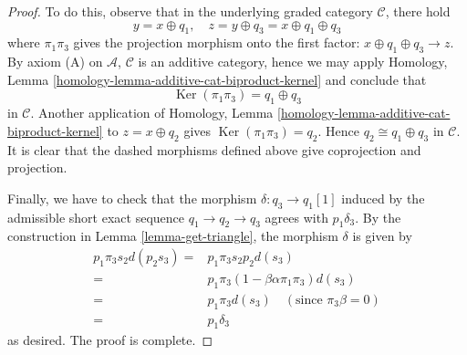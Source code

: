 \documentclass{stacks-project}
\theoremstyle{plain}
\theoremstyle{definition}
\theoremstyle{remark}
\numberwithin{equation}{subsection}
\def\Ker{\mathop{\mathrm{Ker}}}
\begin{document}
\begin{proof}
To do this, observe that in the underlying graded category
$\mathcal{C}$, there hold
$$
y = x\oplus q_1,\quad
z = y\oplus q_3 = x\oplus q_1\oplus q_3
$$
where $\pi_1\pi_3$ gives the projection morphism onto the first
factor: $x\oplus q_1\oplus q_3\to z$. By axiom (A) on
$\mathcal{A}$, $\mathcal{C}$ is an additive category, hence
we may apply
Homology, Lemma \ref{homology-lemma-additive-cat-biproduct-kernel}
and conclude that
$$
\Ker(\pi_1\pi_3) = q_1\oplus q_3
$$
in $\mathcal{C}$. Another application of
Homology, Lemma \ref{homology-lemma-additive-cat-biproduct-kernel}
to $z = x\oplus q_2$ gives $\Ker(\pi_1\pi_3) = q_2$.
Hence $q_2\cong q_1\oplus q_3$ in $\mathcal{C}$.
It is clear that the dashed morphisms defined above give
coprojection and projection.

\medskip\noindent
Finally, we have to check that the morphism
$\delta : q_3 \to q_1[1]$ induced by the admissible
short exact sequence $q_1\to q_2\to q_3$ agrees with
$p_1\delta_3$. By the construction in
Lemma \ref{lemma-get-triangle}, the morphism $\delta$ is given by
\begin{align*}
p_1\pi_3s_2d(p_2s_3)
= &
p_1\pi_3s_2p_2d(s_3) \\
= &
p_1\pi_3(1-\beta\alpha\pi_1\pi_3)d(s_3) \\
= &
p_1\pi_3d(s_3)\quad (\text{since }\pi_3\beta = 0) \\
= &
p_1\delta_3
\end{align*}
as desired. The proof is complete.
\end{proof}
\end{document}
